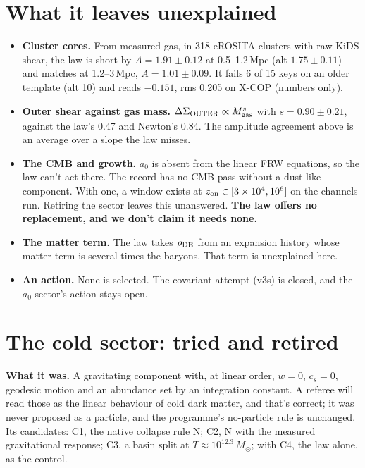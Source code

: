 \documentclass[10pt]{article}
\begin{document}
\section{What it leaves unexplained}\label{sec:gaps}
\begin{itemize}
\item \textbf{Cluster cores.} From measured gas, in 318 eROSITA clusters with raw KiDS shear, the law is short by $A=1.91\pm0.12$ at 0.5--1.2\,Mpc (alt $1.75\pm0.11$) and matches at 1.2--3\,Mpc, $A=1.01\pm0.09$. It fails 6 of 15 keys on an older template (alt 10) and reads $-0.151$, rms 0.205 on X-COP (numbers only).
\item \textbf{Outer shear against gas mass.} $\Delta\Sigma_{\rm OUTER}\propto M_{\rm gas}^{s}$ with $s=0.90\pm0.21$, against the law's 0.47 and Newton's 0.84. The amplitude agreement above is an average over a slope the law misses.
\item \textbf{The CMB and growth.} $a_0$ is absent from the linear FRW equations, so the law can't act there. The record has no CMB pass without a dust-like component. With one, a window exists at $z_{\rm on}\in[3\times10^4,10^6]$ on the channels run. Retiring the sector leaves this unanswered. \textbf{The law offers no replacement, and we don't claim it needs none.}
\item \textbf{The matter term.} The law takes $\rho_{\rm DE}$ from an expansion history whose matter term is several times the baryons. That term is unexplained here.
\item \textbf{An action.} None is selected. The covariant attempt (v3s) is closed, and the $a_0$ sector's action stays open.
\end{itemize}

\section{The cold sector: tried and retired}\label{sec:cold}
\textbf{What it was.} A gravitating component with, at linear order, $w=0$, $c_s=0$, geodesic motion and an abundance set by an integration constant. A referee will read those as the linear behaviour of cold dark matter, and that's correct; it was never proposed as a particle, and the programme's no-particle rule is unchanged. Its candidates: C1, the native collapse rule N; C2, N with the measured gravitational response; C3, a basin split at $T\approx10^{12.3}\,M_\odot$; with C4, the law alone, as the control.
\end{document}
